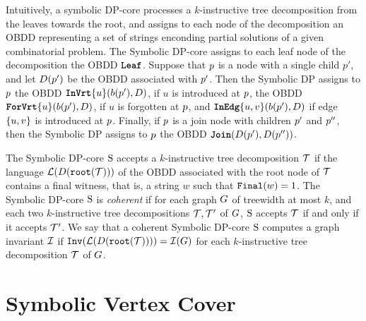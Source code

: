 Intuitively, a symbolic DP-core processes a $k$-instructive tree decomposition from the leaves towards the root, and assigns to each node of the decomposition an OBDD representing a set of strings enconding partial solutions of a given combinatorial problem. The Symbolic DP-core assigns to each leaf node of the decomposition the OBDD $\texttt{\textbf{Leaf}}$. Suppose that $p$ is a node with a single child $p'$, and let $D(p')$ be the OBDD associated with $p'$. Then the Symbolic DP assigns to $p$ the OBDD 
$\texttt{\textbf{InVrt}}\{u\}(b(p'),D)$, if $u$ is introduced at $p$, the OBDD 
$\texttt{\textbf{ForVrt}}\{u\}(b(p'),D)$, if $u$ is forgotten at $p$, and 
$\texttt{\textbf{InEdg}}\{u,v\}(b(p'),D)$ if edge $\{u,v\}$ is introduced at $p$. Finally, if $p$ is a join node with children $p'$ and $p''$, then the Symbolic DP assigns to $p$ the OBDD 
$\texttt{\textbf{Join}}(D(p'),D(p''))$. 

The Symbolic DP-core $\mathrm{S}$ accepts a $k$-instructive tree decomposition  $\mathcal{T}$ if the language $\mathcal{L}(D(\texttt{root}(\mathcal{T})))$ of the OBDD associated with the root node of $\mathcal{T}$ contains a final witness, 
that is, a string $w$ such that $\texttt{Final}(w)=1$. The Symbolic DP-core $\mathrm{S}$ is {\em coherent} if for 
each graph $G$ of treewidth at most $k$, and each two $k$-instructive tree 
decompositions $\mathcal{T},\mathcal{T}'$ of $G$, $\mathrm{S}$ accepts $\mathcal{T}$ if and only if 
it accepts $\mathcal{T}'$. We say that a coherent Symbolic DP-core $\mathrm{S}$ computes a graph invariant 
$\mathcal{I}$ if $\texttt{Inv}(\mathcal{L}(D(\texttt{root}(\mathcal{T})))) = \mathcal{I}(G)$ for each $k$-instructive tree decomposition $\mathcal{T}$ of $G$. 


\section{Symbolic Vertex Cover}\label{Symbolic Vertex Cover (sketch)}

